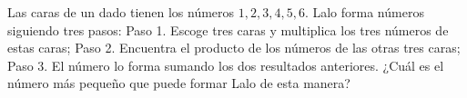 Las caras de un dado tienen los números $1, 2, 3, 4, 5, 6$. Lalo forma números siguiendo tres pasos: Paso 1. Escoge tres caras y multiplica los tres números de estas caras; Paso 2. Encuentra el producto de los números de las otras tres caras; Paso 3. El número lo forma sumando los dos resultados anteriores. ¿Cuál es el número más pequeño que puede formar Lalo de esta manera?